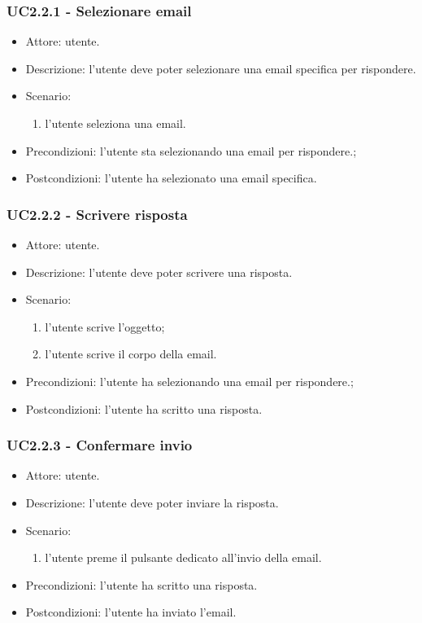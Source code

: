     \subsubsection{UC2.2.1 - Selezionare email}
    \begin{itemize}
        \item Attore: utente.
        \item Descrizione: l'utente deve poter selezionare una email specifica per rispondere.
        \item Scenario:
        \begin{enumerate}
        \item l'utente seleziona una email.
        \end{enumerate}
        \item Precondizioni: l'utente sta selezionando una email per rispondere.;
        \item Postcondizioni: l'utente ha selezionato una email specifica.
    \end{itemize}

    \subsubsection{UC2.2.2 - Scrivere risposta}
    \begin{itemize}
        \item Attore: utente.
        \item Descrizione: l'utente deve poter scrivere una risposta.
        \item Scenario:
        \begin{enumerate}
        \item l'utente scrive l'oggetto;
        \item l'utente scrive il corpo della email.
        \end{enumerate}
        \item Precondizioni: l'utente ha selezionando una email per rispondere.;
        \item Postcondizioni: l'utente ha scritto una risposta.
    \end{itemize}

    \subsubsection{UC2.2.3 - Confermare invio}
    \begin{itemize}
        \item Attore: utente.
        \item Descrizione: l'utente deve poter inviare la risposta.
        \item Scenario:
        \begin{enumerate}
        \item l'utente preme il pulsante dedicato all'invio della email.
        \end{enumerate}
        \item Precondizioni: l'utente ha scritto una risposta.
        \item Postcondizioni: l'utente ha inviato l'email.
    \end{itemize}

